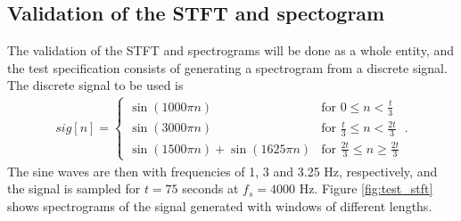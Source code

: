 \subsection{Validation of the STFT and spectogram}
The validation of the STFT and spectrograms will be done as a whole entity, and the test specification consists of generating a spectrogram from a discrete signal. The discrete signal to be used is
\begin{align}\label{eq:SPECTROsignal}
sig[n]=\begin{cases}\sin(1000\pi n)&\text{for }0\leq n<\frac{t}{3}\\
\sin(3000\pi n)&\text{for }\frac{t}{3}\leq n < \frac{2t}{3}\\
\sin(1500\pi n)+\sin(1625\pi n)&\text{for }\frac{2t}{3}\leq n\geq\frac{2t}{3}
\end{cases}.
\end{align}
The sine waves are then with frequencies of 1, 3 and 3.25 Hz, respectively, and the signal is sampled for $t=75$ seconds at $f_s=4000$ Hz. Figure \ref{fig:test_stft} shows spectrograms of the signal generated with windows of different lengths.
